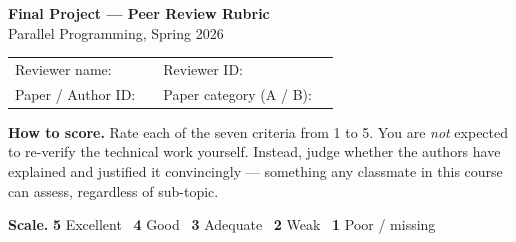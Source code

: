 \documentclass[11pt]{article}
\begin{document}
\begin{center}
{\large\bfseries Final Project --- Peer Review Rubric}\\[2pt]
Parallel Programming, Spring 2026
\end{center}

\vspace{0.4em}

\begin{tabularx}{\textwidth}{@{}lX lX@{}}
Reviewer name: & \hrulefill & Reviewer ID: & \hrulefill \\[4pt]
Paper / Author ID: & \hrulefill & Paper category (A / B): & \hrulefill \\
\end{tabularx}

\vspace{0.8em}

\textbf{How to score.} Rate each of the seven criteria from 1 to 5. You are
\emph{not} expected to re-verify the technical work yourself. Instead, judge
whether the authors have explained and justified it convincingly --- something
any classmate in this course can assess, regardless of sub-topic.

\vspace{0.4em}

\textbf{Scale.}\quad
\textbf{5} Excellent \,\textbar\;
\textbf{4} Good \,\textbar\;
\textbf{3} Adequate \,\textbar\;
\textbf{2} Weak \,\textbar\;
\textbf{1} Poor / missing

\vspace{0.8em}
\end{document}
